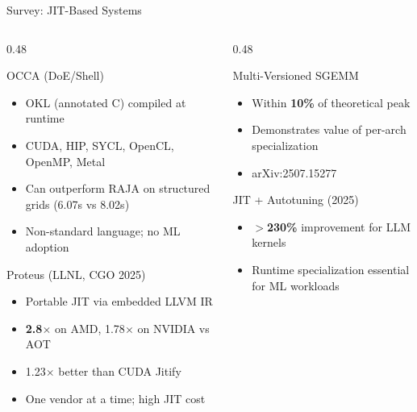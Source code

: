 \documentclass[aspectratio=169,10pt]{beamer}
\begin{document}
\begin{frame}{Survey: JIT-Based Systems}
  \begin{columns}[T]
    \begin{column}{0.48\textwidth}
      \begin{block}{OCCA (DoE/Shell)}
        \begin{itemize}
          \item OKL (annotated C) compiled at runtime
          \item CUDA, HIP, SYCL, OpenCL, OpenMP, Metal
          \item Can outperform RAJA on structured grids (6.07s vs 8.02s)
          \item \textcolor{codered}{Non-standard language; no ML adoption}
        \end{itemize}
      \end{block}
      \begin{block}{Proteus (LLNL, CGO 2025)}
        \begin{itemize}
          \item Portable JIT via embedded LLVM IR
          \item \textbf{2.8$\times$} on AMD, 1.78$\times$ on NVIDIA vs AOT
          \item 1.23$\times$ better than CUDA Jitify
          \item \textcolor{codered}{One vendor at a time; high JIT cost}
        \end{itemize}
      \end{block}
    \end{column}
    \begin{column}{0.48\textwidth}
      \begin{block}{Multi-Versioned SGEMM}
        \begin{itemize}
          \item Within \textbf{10\%} of theoretical peak
          \item Demonstrates value of per-arch specialization
          \item arXiv:2507.15277
        \end{itemize}
      \end{block}
      \begin{block}{JIT + Autotuning (2025)}
        \begin{itemize}
          \item \textbf{$>$230\%} improvement for LLM kernels
          \item Runtime specialization essential for ML workloads

\end{itemize}
\end{block}
\end{column}
\end{columns}
\end{frame}
\end{document}
